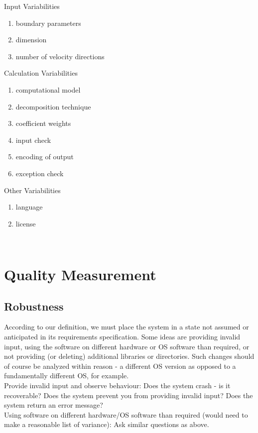 \documentclass{article}
\begin{document}
Input Variabilities
\begin{enumerate}
	\item boundary parameters
	\item dimension
	\item number of velocity directions
\end{enumerate}

\noindent Calculation Variabilities
\begin{enumerate}
	\item computational model
	\item decomposition technique
	\item coefficient weights
	\item input check
	\item encoding of output
	\item exception check
\end{enumerate}

\noindent Other Variabilities
\begin{enumerate}
	\item language
	\item license
\end{enumerate}

~\newpage
\section{Quality Measurement}
\subsection{Robustness}
According to our definition, we must place the system in a state not assumed or anticipated in its requirements specification. Some ideas are providing invalid input, using the software on different hardware or OS software than required, or not providing (or deleting) additional libraries or directories. Such changes should of course be analyzed within reason - a different OS version as opposed to a fundamentally different OS, for example.\\ 

Provide invalid input and observe behaviour: Does the system crash - is it recoverable? Does the system prevent you from providing invalid input? Does the system return an error message?\\

Using software on different hardware/OS software than required (would need to make a reasonable list of variance): Ask similar questions as above. \\
\end{document}
